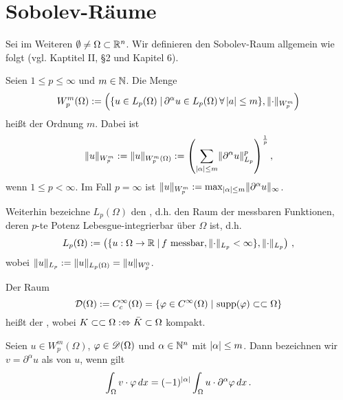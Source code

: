 \appendix

\label{anhang:A}

\section{Sobolev-Räume}
\label{anhang:A.1}

Sei im Weiteren $\emptyset \not= \Omega \subset \mathbb{R}^n$. Wir definieren den Sobolev-Raum allgemein wie folgt (vgl. \cite{BraeFEM} Kaptitel II, \S 2 und \cite{Walker} Kapitel 6).

\begin{defi}\label{def:A.1}
  Seien $1\leq p\leq\infty$ und $m\in\mathbb{N}$. Die Menge
  \[
  W_p^m(\Omega):=\left(
    \{u\in L_p(\Omega)\;\vert\,\partial^\alpha u\in L_p(\Omega)\,\forall\,\lvert a\rvert\leq m\}
    , \lVert \cdot\rVert_{W_p^m}
  \right)
  \]
  heißt \textit{} der Ordnung $m$. Dabei ist 
  \[
  \lVert u\rVert_{W_p^m}:=\lVert u\rVert_{W_p^m(\Omega)}:=
  \left(
    \sum_{\lvert \alpha\rvert\leq m}\lVert \partial^\alpha u\rVert_{L_p}^p
  \right)^{\frac 1p},
  \]
  wenn $1\leq p<\infty$. Im Fall $p=\infty$ ist $\lVert u\rVert_{W_p^m}:=\max_{\lvert \alpha\rvert\leq m}\lVert \partial^\alpha u\rVert_\infty$. 
  
  Weiterhin bezeichne $L_p(\Omega)$ den \textit{}, d.h. den Raum der messbaren Funktionen, deren $p$-te Potenz Lebesgue-integrierbar über $\Omega$ ist, d.h.
  \[
  	L_p(\Omega) := \left( \{u : \Omega \rightarrow \mathbb{R} \;\vert\, f \text{ messbar}, \lVert \cdot\rVert_{L_p} < \infty\},\lVert \cdot\rVert_{L_p} \right) \, ,
  \]
  wobei $\lVert u\rVert_{L_p} := \lVert u\rVert_{L_p(\Omega)} =\lVert u\rVert_{W^0_p}$.
\end{defi}

\begin{defi}\label{def:A.2}
Der Raum
\[
	\mathcal D(\Omega) := C_c^\infty (\Omega)= \{ \varphi \in C^\infty(\Omega) \;\vert\, \operatorname{supp} (\varphi) \subset\subset \Omega \}
\]
heißt der \textit{}, wobei $K\subset\subset \Omega :\Leftrightarrow  \bar K \subset \Omega$ kompakt.
\end{defi}

\begin{bem}\label{bem:A.3}
 Seien $u\in W_p^m(\Omega)$, $\varphi\in\mathscr{D}(\Omega)$ und $\alpha\in\mathbb{N}^n$ mit $\lvert \alpha\rvert\leq m$. Dann  bezeichnen wir $v = \partial^\alpha u$ als \textit{} von $u$, wenn gilt
    \[
      \int_\Omega v\cdot\varphi \, d x=(-1)^{\lvert \alpha\rvert}\int_\Omega u\cdot\partial^\alpha\varphi \,  d x\, .
    \]
\end{bem}

